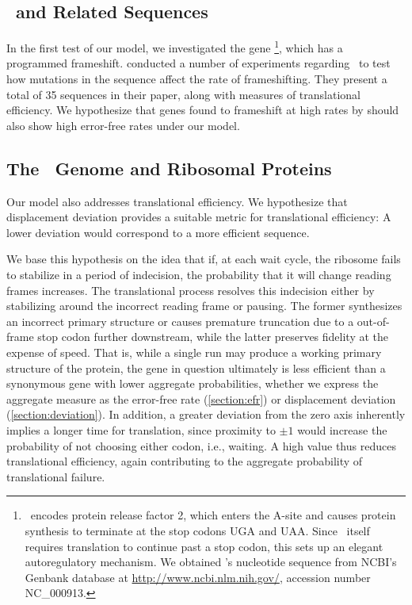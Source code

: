 \documentclass[12pt]{article}
\begin{document}
\subsection{\prfB\ and Related Sequences}
In the first test of our model, we investigated the gene
\prfB\footnote{
  \prfB\ encodes protein release factor 2, which enters
  the A-site and causes protein synthesis to terminate at the stop
  codons \textsc{UGA} and \textsc{UAA}. Since \prfB\ itself requires 
  translation to continue past a stop codon, this sets up an elegant 
  autoregulatory mechanism. We obtained \prfB's nucleotide sequence from
  NCBI's Genbank database at \url{http://www.ncbi.nlm.nih.gov/}, accession
  number NC\_000913.
}, which has a programmed frameshift.
\citet{weiss87} conducted a number of experiments regarding
\prfB\ to test how mutations in the sequence affect the rate of
frameshifting.  They present a total of 35 sequences in their paper,
along with measures of translational efficiency.  We hypothesize that
genes found to frameshift at high rates by
\citeauthor{weiss87} should also show high error-free rates under
our model.

\subsection{The \ecoli\ Genome and Ribosomal Proteins}
Our model also addresses
translational efficiency. We hypothesize that displacement deviation
provides a suitable metric for translational efficiency: A lower
deviation would correspond to a more efficient sequence.

We base this hypothesis on the idea that if, at each wait cycle, the
ribosome fails to stabilize in a period of indecision, the probability
that it will change reading frames increases. The translational
process resolves this indecision either by stabilizing around the
incorrect reading frame or pausing. The former synthesizes an
incorrect primary structure or causes premature truncation due to a
out-of-frame stop codon further downstream, while the latter preserves fidelity at the
expense of speed. That is, while a single run may produce
a working primary structure of the protein, the gene in question
ultimately is less efficient than a synonymous gene with lower
aggregate probabilities, whether we express the aggregate measure as the
error-free rate (\autoref{section:efr}) or displacement deviation
(\autoref{section:deviation}). In addition, a greater deviation from
the zero axis inherently implies a longer time for translation, 
since proximity to $\pm1$ would increase the probability of not choosing
either codon, i.e., waiting. A high value thus reduces translational
efficiency, again contributing to the aggregate probability of
translational failure.
\end{document}
